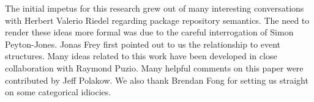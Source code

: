 \documentclass[hoptionsi,review,screen,format=sigconf]{acmart}
\theoremstyle{definition}
\begin{document}





\begin{acks}
The initial impetus for this research grew out of many interesting conversations with Herbert Valerio Riedel regarding package repository semantics. The need to render these ideas more formal was due to the careful interrogation of Simon Peyton-Jones. Jonas Frey first pointed out to us the relationship to event structures. Many ideas related to this work have been developed in close collaboration with Raymond Puzio. Many helpful comments on this paper were contributed by Jeff Polakow. We also thank Brendan Fong for setting us straight on some categorical idiocies.
\end{acks}


 
 
\end{document}
